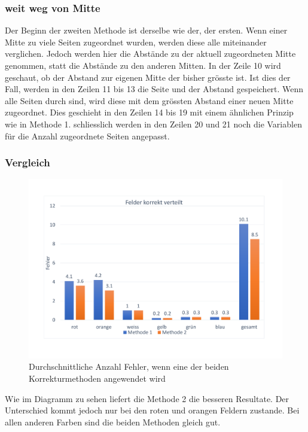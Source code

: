 \documentclass[a4paper, 12pt]{article}
\begin{document}
\subsubsection{weit weg von Mitte}
Der Beginn der zweiten Methode ist derselbe wie der, der ersten. Wenn einer Mitte zu viele Seiten zugeordnet wurden, werden  diese alle miteinander verglichen. Jedoch werden hier die Abstände zu der aktuell zugeordneten Mitte genommen, statt die Abstände zu den anderen Mitten. In der Zeile 10 wird geschaut, ob der Abstand zur eigenen Mitte der bisher grösste ist. Ist dies der Fall, werden in den Zeilen 11 bis 13 die Seite und der Abstand gespeichert. Wenn alle Seiten durch sind, wird diese mit dem grössten Abstand einer neuen Mitte zugeordnet. Dies geschieht in den Zeilen 14 bis 19 mit einem ähnlichen Prinzip wie in Methode 1. schliesslich werden in den Zeilen 20 und 21 noch die Variablen für die Anzahl zugeordnete Seiten angepasst.

\subsubsection{Vergleich}
\begin{figure}[H]
\includegraphics[scale=0.4]{Felder_korrekt_verteilt}
\caption{Durchschnittliche Anzahl Fehler, wenn eine der beiden Korrekturmethoden angewendet wird}
\end{figure}
Wie im Diagramm zu sehen liefert die Methode 2 die besseren Resultate. Der Unterschied kommt jedoch nur bei den roten und orangen Feldern zustande. Bei allen anderen Farben sind die beiden Methoden gleich gut. 
\end{document}

